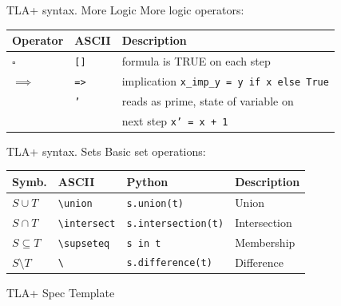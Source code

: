 \documentclass[12pt]{beamer}
\begin{document}
  \begin{frame}{TLA+ syntax. More Logic}
      More logic operators:
        \begin{table}
        \centering
            \begin{tabular}{@{} llp{9cm} @{}}
                Operator    & ASCII       & Description   \\ \hline
                $\square$   & \texttt{[]} & formula is TRUE on each step  \\
                $\implies$  & \texttt{=>} & implication \texttt{x_imp_y = y if x else True}\\
                \boxed{$'$} & \texttt{'}  & reads as prime, state of variable on \\
                            &             & next step \texttt{x' = x + 1}\\
            \end{tabular}
        \end{table}
  \end{frame}
  \begin{frame}{TLA+ syntax. Sets}
      Basic set operations:
        \begin{table}
        \centering
            \begin{tabular}{@{} lllp{7cm} @{}}
                Symb.           & ASCII                              & Python                                & Description   \\ \hline
                $S \cup T$      & \texttt{\textbackslash union}      &\texttt{s.union(t)}        & Union\\
                $S \cap T$      & \texttt{\textbackslash intersect}  &\texttt{s.intersection(t)} & Intersection \\
                $S \subseteq T$ & \texttt{\textbackslash supseteq}   &\texttt{s in t}            & Membership  \\
                $S \setminus T$ & \texttt{\textbackslash}            &\texttt{s.difference(t)}   & Difference \\
            \end{tabular}
        \end{table}
  \end{frame}
  \begin{frame}{TLA+ Spec Template}
      \begin{center}
          \inputminted[linenos, fontsize=\scriptsize]{tla}{figures/template.tla}
      \end{center}
  \end{frame}
\end{document}

